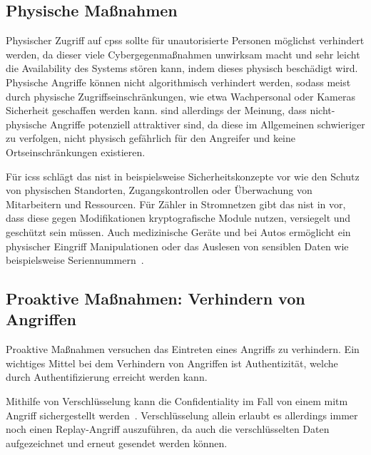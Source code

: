 \documentclass[final,bibliography=totocnumbered]{include/sikseminar}
\newcommand{\cps}{\glspl{cps}\xspace}
\begin{document}
\subsection{Physische Maßnahmen}\label{subsec:physisch}
Physischer Zugriff auf \cps sollte für unautorisierte Personen möglichst verhindert werden, da dieser viele Cybergegenmaßnahmen unwirksam macht und sehr leicht die Availability des Systems stören kann, indem dieses physisch beschädigt wird.
Physische Angriffe können nicht algorithmisch verhindert werden, sodass meist durch physische Zugriffseinschränkungen, wie etwa Wachpersonal oder Kameras Sicherheit geschaffen werden kann.
\citeauthor{CAS08} sind allerdings der Meinung, dass nicht-physische Angriffe potenziell attraktiver sind, da diese im Allgemeinen schwieriger zu verfolgen, nicht physisch gefährlich für den Angreifer und keine Ortseinschränkungen existieren.

Für \glspl{ics} schlägt das \gls{nist} in \cite{HUM 153} beispielsweise Sicherheitskonzepte vor wie den Schutz von physischen Standorten, Zugangskontrollen oder Überwachung von Mitarbeitern und Ressourcen.
Für Zähler in Stromnetzen gibt das \gls{nist} in \cite{HUM 127} vor, dass diese gegen Modifikationen kryptografische Module nutzen, versiegelt und geschützt sein müssen.
Auch medizinische Geräte und bei Autos ermöglicht ein physischer Eingriff Manipulationen oder das Auslesen von sensiblen Daten wie beispielsweise Seriennummern~\cite{HLL+17}.



\subsection{Proaktive Maßnahmen: Verhindern von Angriffen}\label{subsec:proactive}
Proaktive Maßnahmen versuchen das Eintreten eines Angriffs zu verhindern.
Ein wichtiges Mittel bei dem Verhindern von Angriffen ist Authentizität, welche durch Authentifizierung erreicht werden kann.

Mithilfe von Verschlüsselung kann die Confidentiality im Fall von einem \gls{mitm} Angriff sichergestellt werden~\cite{HLL+17}.
Verschlüsselung allein erlaubt es allerdings immer noch einen Replay-Angriff auszuführen, da auch die verschlüsselten Daten aufgezeichnet und erneut gesendet werden können.
\end{document}
